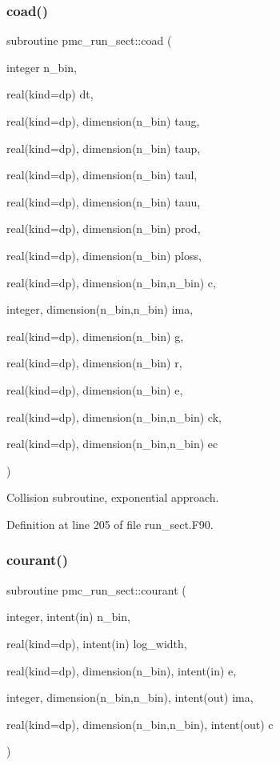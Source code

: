 \subsubsection{\texorpdfstring{coad()}{coad()}}
{\footnotesize\ttfamily subroutine pmc\+\_\+run\+\_\+sect\+::coad (\begin{DoxyParamCaption}\item[{integer}]{n\+\_\+bin,  }\item[{real(kind=dp)}]{dt,  }\item[{real(kind=dp), dimension(n\+\_\+bin)}]{taug,  }\item[{real(kind=dp), dimension(n\+\_\+bin)}]{taup,  }\item[{real(kind=dp), dimension(n\+\_\+bin)}]{taul,  }\item[{real(kind=dp), dimension(n\+\_\+bin)}]{tauu,  }\item[{real(kind=dp), dimension(n\+\_\+bin)}]{prod,  }\item[{real(kind=dp), dimension(n\+\_\+bin)}]{ploss,  }\item[{real(kind=dp), dimension(n\+\_\+bin,n\+\_\+bin)}]{c,  }\item[{integer, dimension(n\+\_\+bin,n\+\_\+bin)}]{ima,  }\item[{real(kind=dp), dimension(n\+\_\+bin)}]{g,  }\item[{real(kind=dp), dimension(n\+\_\+bin)}]{r,  }\item[{real(kind=dp), dimension(n\+\_\+bin)}]{e,  }\item[{real(kind=dp), dimension(n\+\_\+bin,n\+\_\+bin)}]{ck,  }\item[{real(kind=dp), dimension(n\+\_\+bin,n\+\_\+bin)}]{ec }\end{DoxyParamCaption})}



Collision subroutine, exponential approach. 



Definition at line 205 of file run\+\_\+sect.\+F90.

\mbox{\label{namespacepmc__run__sect_a55df1799d03853355ca1d55274b370df}} 
\subsubsection{\texorpdfstring{courant()}{courant()}}
{\footnotesize\ttfamily subroutine pmc\+\_\+run\+\_\+sect\+::courant (\begin{DoxyParamCaption}\item[{integer, intent(in)}]{n\+\_\+bin,  }\item[{real(kind=dp), intent(in)}]{log\+\_\+width,  }\item[{real(kind=dp), dimension(n\+\_\+bin), intent(in)}]{e,  }\item[{integer, dimension(n\+\_\+bin,n\+\_\+bin), intent(out)}]{ima,  }\item[{real(kind=dp), dimension(n\+\_\+bin,n\+\_\+bin), intent(out)}]{c }\end{DoxyParamCaption})}



